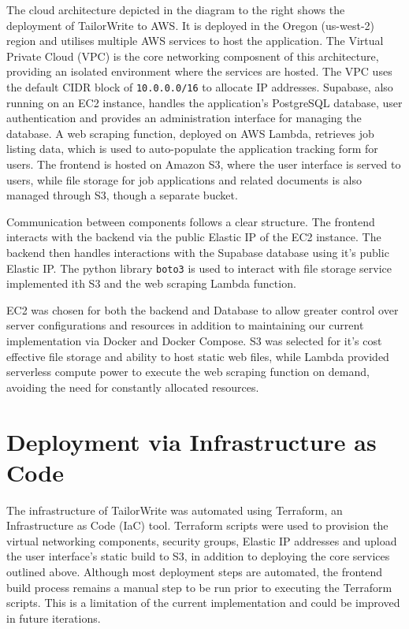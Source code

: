 \documentclass[a4paper, 11pt]{article}
\begin{document}
The cloud architecture depicted in the diagram to the right shows the deployment of TailorWrite to AWS. It is deployed in the Oregon (us-west-2) region and utilises multiple AWS services to host the application. The Virtual Private Cloud (VPC) is the core networking composnent of this architecture, providing an isolated environment where the services are hosted. The VPC uses the default CIDR block of \texttt{10.0.0.0/16} to allocate IP addresses. Supabase, also running on an EC2 instance, handles the application's PostgreSQL database, user authentication and provides an administration interface for managing the database. A web scraping function, deployed on AWS Lambda, retrieves job listing data, which is used to auto-populate the application tracking form for users. The frontend is hosted on Amazon S3, where the user interface is served to users, while file storage for job applications and related documents is also managed through S3, though a separate bucket.

Communication between components follows a clear structure. The frontend interacts with the backend via the public Elastic IP of the EC2 instance. The backend then handles interactions with the Supabase database using it's public Elastic IP. The python library \texttt{boto3} is used to interact with file storage service implemented ith S3 and the web scraping Lambda function. 


EC2 was chosen for both the backend and Database to allow greater control over server configurations and resources in addition to maintaining our current implementation via Docker and Docker Compose. S3 was selected for it's cost effective file storage and ability to host static web files, while Lambda provided serverless compute power to execute the web scraping function on demand, avoiding the need for constantly allocated resources. 

\section{Deployment via Infrastructure as Code}

The infrastructure of TailorWrite was automated using Terraform, an Infrastructure as Code (IaC) tool. Terraform scripts were used to provision the virtual networking components, security groups, Elastic IP addresses and upload the user interface's static build to S3, in addition to deploying the core services outlined above. Although most deployment steps are automated, the frontend build process remains a manual step to be run prior to executing the Terraform scripts. This is a limitation of the current implementation and could be improved in future iterations.
\end{document}
